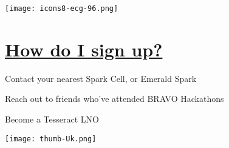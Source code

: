 \documentclass[a4paper]{article}
\begin{document}
{\begin{multicols}{2}
    \columnbreak

        \texttt{[image: icons8-ecg-96.png]}
        
		\section{\underline{How do I sign up?}}

			
		\begin{compactitem}
			\item Contact your nearest Spark Cell, or Emerald Spark
			\item Reach out to friends who've attended BRAVO Hackathons
			\item Become a Tesseract LNO \newline

		
		\newline
				
		\texttt{[image: thumb-Uk.png]}

		\end{compactitem}
    
    \end{multicols}
}


 
\end{document}
